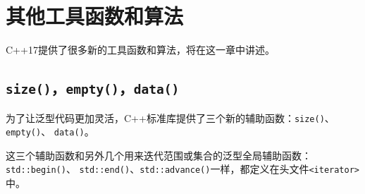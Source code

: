 \chapter{其他工具函数和算法}\label{ch25}
C++17提供了很多新的工具函数和算法，将在这一章中讲述。


\section{\texttt{size()}，\texttt{empty()}，\texttt{data()}}
为了让泛型代码更加灵活，C++标准库提供了三个新的辅助函数：\texttt{size()}、\texttt{empty()}、
\texttt{data()}。

这三个辅助函数和另外几个用来迭代范围或集合的泛型全局辅助函数：\texttt{std::begin()}、
\texttt{std::end()}、\texttt{std::advance()}一样，都定义在头文件\texttt{<iterator>}中。

